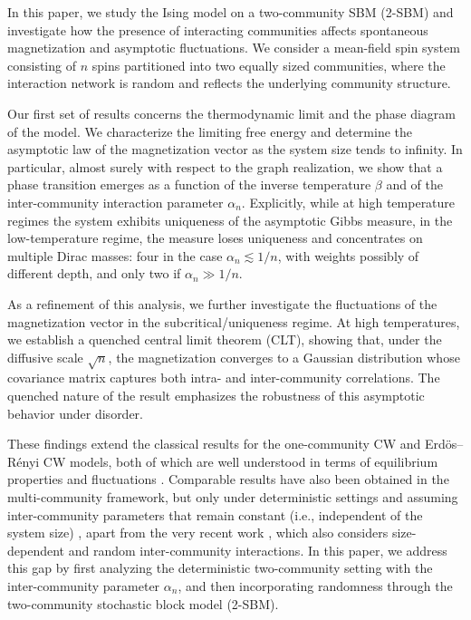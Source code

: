\documentclass[11pt,oneside]{amsart}
\numberwithin{equation}{section}  %
\theoremstyle{plain}
\theoremstyle{remark}
\begin{document}
In this paper, we study the Ising model on a two-community SBM (2-SBM) and investigate how the presence of interacting communities affects spontaneous magnetization and asymptotic fluctuations. We consider a mean-field spin system consisting of $n$ spins partitioned into two equally sized communities, where the interaction network is random and reflects the underlying community structure. 

Our first set of results concerns the thermodynamic limit and the phase diagram of the model. 
We characterize the limiting free energy and determine the asymptotic law of the magnetization vector as the system size tends to infinity. 
In particular, almost surely with respect to the graph realization, we show that a phase transition emerges as a function of the inverse temperature $\beta$ and of the inter-community interaction parameter $\alpha_n$. 
Explicitly, while at high temperature regimes the system exhibits uniqueness of the asymptotic Gibbs measure,  
in the low-temperature regime, the measure loses uniqueness and concentrates on multiple Dirac masses: four in the case $\alpha_n \lesssim 1/n$, with weights possibly of  different depth, and only two if $\alpha_n \gg 1/n$. 

As a refinement of this analysis, we further investigate the fluctuations of the magnetization vector in the subcritical/uniqueness regime. At high temperatures, we establish a quenched central limit theorem (CLT), showing that, under the diffusive scale $\sqrt{n}$, the magnetization converges to a Gaussian distribution whose covariance matrix captures both intra- and inter-community correlations. The quenched nature of the result emphasizes the robustness of this asymptotic behavior under disorder.



These findings extend the classical results for the one-community CW and Erd\"{o}s--R\'enyi CW models, both of which are well understood in terms of equilibrium properties \cite{BG93} and fluctuations \cite{KLS19, KLS20, KLS21, KLS22}.
Comparable results have also been obtained in the multi-community framework, but only under deterministic settings and assuming inter-community parameters that remain constant (i.e., independent of the system size) \cite{C14, LS18, KT20, KLSS20}, apart from the very recent work \cite{LL26}, which also considers size-dependent and random inter-community interactions.
In this paper, we address this gap by first analyzing the deterministic two-community setting with the inter-community parameter 
$\alpha_n$, and then incorporating randomness through the two-community stochastic block model (2-SBM).\\
\end{document}
